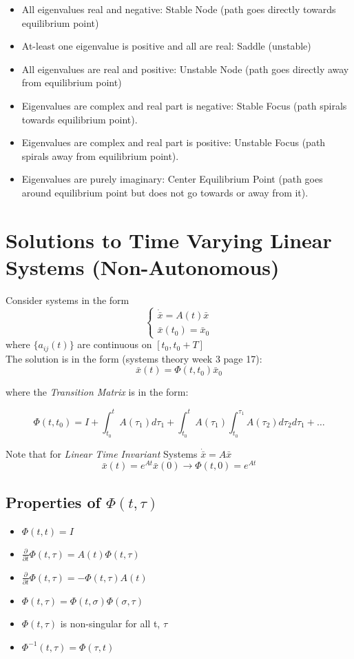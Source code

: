 \documentclass[12pt]{article}
\begin{document}
\begin{itemize}
	\item All eigenvalues real and negative: Stable Node (path goes directly towards equilibrium point)
	\item At-least one eigenvalue is positive and all are real: Saddle (unstable)
	\item All eigenvalues are real and positive: Unstable Node (path goes directly away from equilibrium point)
	\item Eigenvalues are complex and real part is negative: Stable Focus (path spirals towards equilibrium point).
	\item Eigenvalues are complex and real part is positive: Unstable Focus (path spirals away from equilibrium point).
	\item Eigenvalues are purely imaginary: Center Equilibrium Point (path goes around equilibrium point but does not go towards or away from it).
\end{itemize}

\section*{Solutions to Time Varying Linear Systems (Non-Autonomous)}
Consider systems in the form 
$$ 
\begin{cases}
\dot{\bar{x}}=A(t)\bar{x} \\
\bar{x}(t_0)=\bar{x}_0
\end{cases}
$$
where $\{a_{ij}(t)\}$ are continuous on $[t_0,t_0+T]$ \\

\noindent
The solution is in the form (systems theory week 3 page 17):
$$\bar{x}(t)=\Phi(t,t_0)\bar{x}_0$$

\noindent
where the {\em Transition Matrix} is in the form:

$$ \Phi(t,t_0) = I + \int_{t_0}^t A(\tau_1)d\tau_1+\int_{t_0}^tA(\tau_1)\int_{t_0}^{\tau_1}A(\tau_2)d\tau_2d\tau_1+\dots$$

\noindent
Note that for {\em Linear Time Invariant} Systems $\dot{\bar{x}}=A\bar{x}$ 
$$\bar{x}(t)=e^{At}\bar{x}(0)\rightarrow \Phi(t,0)=e^{At}$$

\subsection*{Properties of $ \Phi(t,\tau)$}

\begin{itemize}
	\item $\Phi(t,t) = I$
	\item $\frac{\partial}{\partial t}\Phi(t,\tau)=A(t)\Phi(t,\tau)$
	\item $\frac{\partial}{\partial t}\Phi(t,\tau)=-\Phi(t,\tau)A(t)$
	\item $\Phi(t,\tau)=\Phi(t,\sigma)\Phi(\sigma,\tau)$
	\item $\Phi(t,\tau)$ is non-singular for all t, $\tau$
	\item $\Phi^{-1}(t,\tau)=\Phi(\tau,t)$
\end{itemize}
\end{document}
